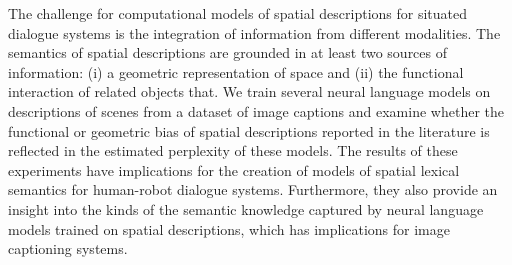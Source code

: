 The challenge for computational models of spatial descriptions for situated dialogue systems is the integration of information from different modalities. The semantics of spatial descriptions are grounded in at least two sources of information: (i) a geometric representation of space and (ii) the functional interaction of related objects that. We train several neural language models on descriptions of scenes from a dataset of image captions and examine whether the functional or geometric bias of spatial descriptions reported in the literature is reflected in the estimated perplexity of these models. The results of these experiments have implications for the creation of models of spatial lexical semantics for human-robot dialogue systems. Furthermore, they also provide an insight into the kinds of the semantic knowledge captured by neural language models trained on spatial descriptions, which has implications for image captioning systems.
